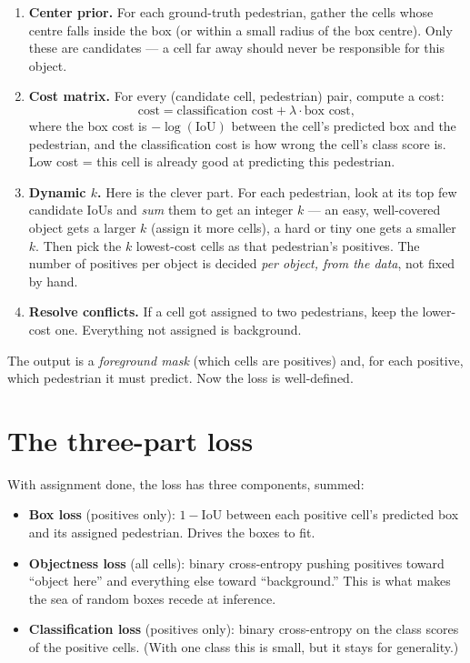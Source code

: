 \documentclass[../main.tex]{subfiles}
\begin{document}
\begin{enumerate}
  \item \textbf{Center prior.} For each ground-truth pedestrian, gather the cells whose centre
        falls inside the box (or within a small radius of the box centre). Only these are
        candidates --- a cell far away should never be responsible for this object.
  \item \textbf{Cost matrix.} For every (candidate cell, pedestrian) pair, compute a cost:
        \[
          \text{cost} = \text{classification cost} + \lambda \cdot \text{box cost},
        \]
        where the box cost is $-\log(\text{IoU})$ between the cell's predicted box and the
        pedestrian, and the classification cost is how wrong the cell's class score is. Low cost
        = this cell is already good at predicting this pedestrian.
  \item \textbf{Dynamic $k$.} Here is the clever part. For each pedestrian, look at its top few
        candidate IoUs and \emph{sum} them to get an integer $k$ --- an easy, well-covered object
        gets a larger $k$ (assign it more cells), a hard or tiny one gets a smaller $k$. Then pick
        the $k$ lowest-cost cells as that pedestrian's positives. The number of positives per
        object is decided \emph{per object, from the data}, not fixed by hand.
  \item \textbf{Resolve conflicts.} If a cell got assigned to two pedestrians, keep the
        lower-cost one. Everything not assigned is background.
\end{enumerate}

The output is a \emph{foreground mask} (which cells are positives) and, for each positive, which
pedestrian it must predict. Now the loss is well-defined.

\section{The three-part loss}

With assignment done, the loss has three components, summed:

\begin{itemize}
  \item \textbf{Box loss} (positives only): $1-\text{IoU}$ between each positive cell's predicted
        box and its assigned pedestrian. Drives the boxes to fit.
  \item \textbf{Objectness loss} (all cells): binary cross-entropy pushing positives toward
        ``object here'' and everything else toward ``background.'' This is what makes the sea of
        random boxes recede at inference.
  \item \textbf{Classification loss} (positives only): binary cross-entropy on the class scores of
        the positive cells. (With one class this is small, but it stays for generality.)
\end{itemize}
\end{document}
